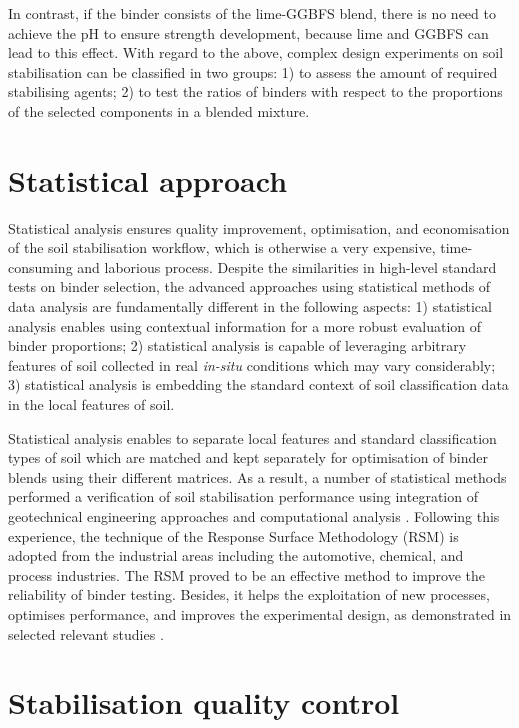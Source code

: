 \documentclass[eprint,
]{actapoly}
\begin{document}
In contrast, if the binder consists of the lime-GGBFS blend, there is no need to achieve the pH to ensure strength development, because lime and GGBFS can lead to this effect. With regard to the above, complex design experiments on soil stabilisation can be classified in two groups: 1) to assess the amount of required stabilising agents; 2) to test the ratios of binders with respect to the proportions of the selected components in a blended mixture. 

\section{Statistical approach}
Statistical analysis ensures quality improvement, optimisation, and economisation of the soil stabilisation workflow, which is otherwise a very expensive, time-consuming and laborious process. Despite the similarities in high-level standard tests on binder selection, the advanced approaches using statistical methods of data analysis are fundamentally different in the following aspects: 1) statistical analysis enables using contextual information for a more robust evaluation of binder proportions; 2) statistical analysis is capable of leveraging arbitrary features of soil collected in real \emph{in-situ} conditions which may vary considerably; 3) statistical analysis is embedding the standard context of soil classification data in the local features of soil. 

Statistical analysis enables to separate local features and standard classification types of soil which are matched and kept separately for optimisation of binder blends using their different matrices. As a result, a number of statistical methods performed a verification of soil stabilisation performance using integration of geotechnical engineering approaches and computational analysis \citep{Eissaetal2022,ORourke,Najjar,Kallenetal2016,Ojo,Lindh2021a}. Following this experience, the technique of the Response Surface Methodology (RSM) is adopted from the industrial areas including the automotive, chemical, and process industries. The RSM proved to be an effective method to improve the reliability of binder testing. Besides, it helps the exploitation of new processes, optimises performance, and improves the experimental design, as demonstrated in selected relevant studies \citep{SUBHA2017285,BIAN2021116745,Myres,CHEN2022125723}.

\section{Stabilisation quality control}
\end{document}
